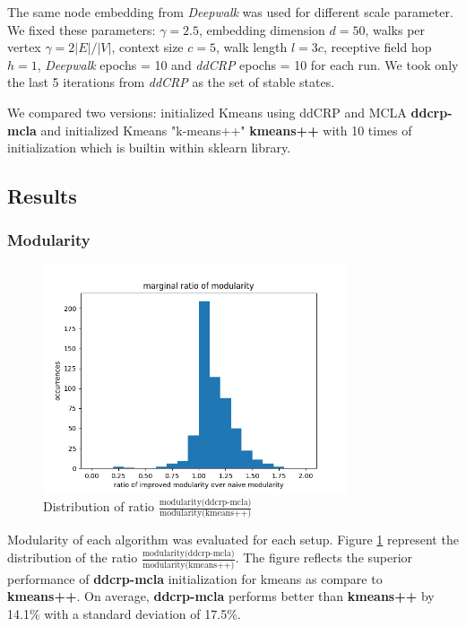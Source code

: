 The same node embedding from \emph{Deepwalk} was used for different scale parameter. We fixed these parameters: $\gamma = 2.5$, embedding dimension $d=50$, walks per vertex $\gamma = 2|E|/|V|$, context size $c = 5$, walk length $l = 3c$, receptive field hop $h=1$, \emph{Deepwalk} epochs = 10 and \emph{ddCRP} epochs = 10 for each run. We took only the last 5 iterations from \emph{ddCRP} as the set of stable states.

We compared two versions: initialized Kmeans using ddCRP and MCLA \textbf{ddcrp-mcla} and initialized Kmeans "k-means++" \textbf{kmeans++} with 10 times of initialization which is builtin within sklearn library.

\subsection{Results}
\subsubsection{Modularity}

\begin{figure}
    \centering
    \includegraphics[width=0.8\textwidth]{report/assets/results/ratio.png}
    \caption{Distribution of ratio $\frac{\text{modularity(ddcrp-mcla)}}{\text{modularity(kmeans++)}}$}
    \label{fig:ratio}
\end{figure}


Modularity of each algorithm was evaluated for each setup. Figure \ref{fig:ratio} represent the distribution of the ratio $\frac{\text{modularity(ddcrp-mcla)}}{\text{modularity(kmeans++)}}$. The figure reflects the superior performance of \textbf{ddcrp-mcla} initialization for kmeans as compare to \textbf{kmeans++}. On average, \textbf{ddcrp-mcla} performs better than \textbf{kmeans++} by 14.1\% with a standard deviation of 17.5\%.

